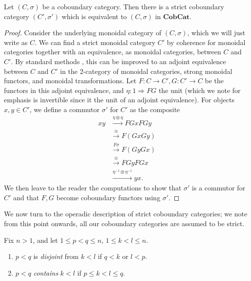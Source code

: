 \documentclass{amsbook} %
\newcommand{\mb}{\mathbf}
\numberwithin{section}{chapter}
\begin{document}
\begin{prop}
Let $(C, \sigma)$ be a coboundary category.  Then there is a strict coboundary category $(C', \sigma')$ which is equivalent to $(C, \sigma)$ in $\mb{CobCat}$.
\end{prop}
\begin{proof}
Consider the underlying monoidal category of $(C, \sigma)$, which we will just write as $C$.  We can find a strict monoidal category $C'$ by coherence for monoidal categories together with an equivalence, as monoidal categories, between $C$ and $C'$.  By standard methods \cite{maclane-catwork}, this can be improved to an adjoint equivalence between $C$ and $C'$ in the 2-category of monoidal categories, strong monoidal functors, and monoidal transformations.  Let $F \colon  C \rightarrow C', G \colon C' \rightarrow C$ be the functors in this adjoint equivalence, and $\eta \colon 1 \Rightarrow FG$ the unit (which we note for emphasis is invertible since it the unit of an adjoint equivalence).  For objects $x,y \in C'$, we define a commutor $\sigma'$ for $C'$ as the composite
  \begin{align*}
    xy & \stackrel{\eta \otimes \eta}{\longrightarrow} FGxFGy \\
    & \stackrel{\cong}{\longrightarrow} F(GxGy) \\
    & \stackrel{F\sigma}{\longrightarrow} F(GyGx) \\
    & \stackrel{\cong}{\longrightarrow}  FGyFGx \\
    & \stackrel{\eta^{-1} \otimes \eta^{-1}}{\longrightarrow} yx.
  \end{align*}
We then leave to the reader the computations to show that $\sigma'$ is a commutor for $C'$ and that $F,G$ become coboundary functors using $\sigma'$.
\end{proof}

We now turn to the operadic description of strict coboundary categories; we note from this point onwards, all our coboundary categories are assumed to be strict.

\begin{Defi}
Fix $n>1$, and let $1 \leq p < q \leq n$, $1 \leq k < l \leq n$.
\begin{enumerate}
\item $p<q$ is \textit{disjoint} from $k<l$ if $q<k$ or $l<p$.
\item $p<q$ \textit{contains} $k<l$ if $p \leq k < l \leq q$.
\end{enumerate}
\end{Defi}
\end{document}
